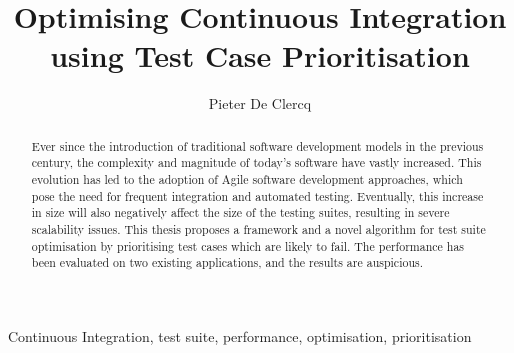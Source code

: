 \documentclass[10pt,twocolumn,twoside]{phdsymp-en}
\begin{document}
	\title{Optimising Continuous Integration\\ using Test Case Prioritisation}
	\author{Pieter De Clercq}
	\maketitle
	
	\begin{abstract}
	Ever since the introduction of traditional software development models in the previous century, the complexity and magnitude of today's software have vastly increased. This evolution has led to the adoption of Agile software development approaches, which pose the need for frequent integration and automated testing. Eventually, this increase in size will also negatively affect the size of the testing suites, resulting in severe scalability issues. This thesis proposes a framework and a novel algorithm for test suite optimisation by prioritising test cases which are likely to fail. The performance has been evaluated on two existing applications, and the results are auspicious.
	\end{abstract}

	\begin{keywords}
		Continuous Integration, test suite, performance, optimisation, prioritisation
	\end{keywords}

	
	
	
	
	
	
	
	
	
\end{document}

